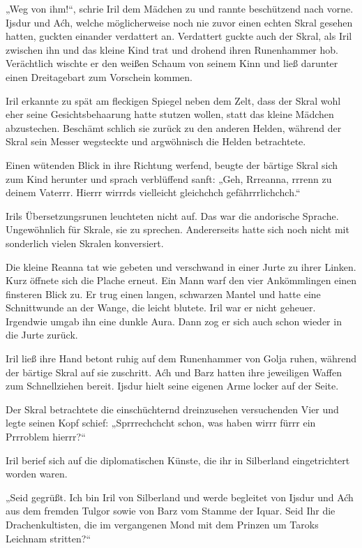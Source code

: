 „Weg von ihm!“, schrie Iril dem Mädchen zu und rannte beschützend nach vorne. Ijsdur und Aćh, welche möglicherweise noch nie zuvor einen echten Skral gesehen hatten, guckten einander verdattert an. Verdattert guckte auch der Skral, als Iril zwischen ihn und das kleine Kind trat und drohend ihren Runenhammer hob. Verächtlich wischte er den weißen Schaum von seinem Kinn und ließ darunter einen Dreitagebart zum Vorschein kommen.

Iril erkannte zu spät am fleckigen Spiegel neben dem Zelt, dass der Skral wohl eher seine Gesichtsbehaarung hatte stutzen wollen, statt das kleine Mädchen abzustechen. Beschämt schlich sie zurück zu den anderen Helden, während der Skral sein Messer wegsteckte und argwöhnisch die Helden betrachtete.

Einen wütenden Blick in ihre Richtung werfend, beugte der bärtige Skral sich zum Kind herunter und sprach verblüffend sanft: „Geh, Rrreanna, rrrenn zu deinem Vaterrr. Hierrr wirrrds vielleicht gleichchch gefährrrlichchch.“

Irils Übersetzungsrunen leuchteten nicht auf. Das war die andorische Sprache. Ungewöhnlich für Skrale, sie zu sprechen. Andererseits hatte sich noch nicht mit sonderlich vielen Skralen konversiert.

Die kleine Reanna tat wie gebeten und verschwand in einer Jurte zu ihrer Linken. Kurz öffnete sich die Plache erneut. Ein Mann warf den vier Ankömmlingen einen finsteren Blick zu. Er trug einen langen, schwarzen Mantel und hatte eine Schnittwunde an der Wange, die leicht blutete. Iril war er nicht geheuer. Irgendwie umgab ihn eine dunkle Aura. Dann zog er sich auch schon wieder in die Jurte zurück.

Iril ließ ihre Hand betont ruhig auf dem Runenhammer von Golja ruhen, während der bärtige Skral auf sie zuschritt. Aćh und Barz hatten ihre jeweiligen Waffen zum Schnellziehen bereit. Ijsdur hielt seine eigenen Arme locker auf der Seite.

Der Skral betrachtete die einschüchternd dreinzusehen versuchenden Vier und legte seinen Kopf schief: „Sprrrechchcht schon, was haben wirrr fürrr ein Prrroblem hierrr?“

Iril berief sich auf die diplomatischen Künste, die ihr in Silberland eingetrichtert worden waren.

„Seid gegrüßt. Ich bin Iril von Silberland und werde begleitet von Ijsdur und Aćh aus dem fremden Tulgor sowie von Barz vom Stamme der Iquar. Seid Ihr die Drachenkultisten, die im vergangenen Mond mit dem Prinzen um Taroks Leichnam stritten?“

